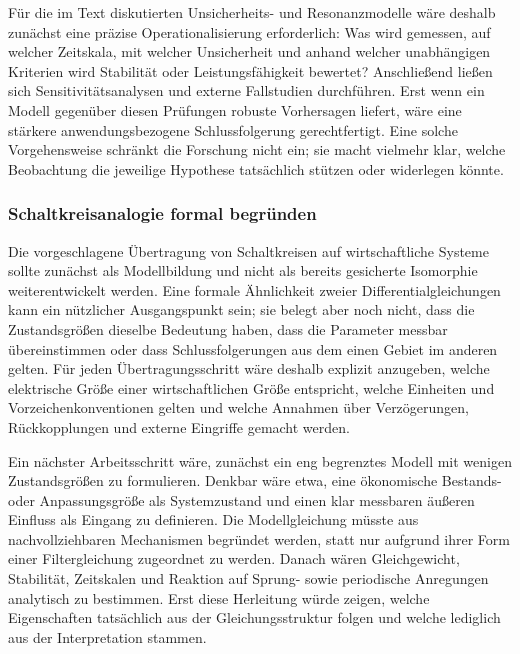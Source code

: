 \documentclass[a4paper,12pt,twoside]{report}
\theoremstyle{definition}
\begin{document}
Für die im Text diskutierten Unsicherheits- und Resonanzmodelle wäre deshalb zunächst eine präzise Operationalisierung erforderlich: Was wird gemessen, auf welcher Zeitskala, mit welcher Unsicherheit und anhand welcher unabhängigen Kriterien wird Stabilität oder Leistungsfähigkeit bewertet? Anschließend ließen sich Sensitivitätsanalysen und externe Fallstudien durchführen. Erst wenn ein Modell gegenüber diesen Prüfungen robuste Vorhersagen liefert, wäre eine stärkere anwendungsbezogene Schlussfolgerung gerechtfertigt. Eine solche Vorgehensweise schränkt die Forschung nicht ein; sie macht vielmehr klar, welche Beobachtung die jeweilige Hypothese tatsächlich stützen oder widerlegen könnte.

\subsubsection{Schaltkreisanalogie formal begründen}

Die vorgeschlagene Übertragung von Schaltkreisen auf wirtschaftliche Systeme sollte zunächst als Modellbildung und nicht als bereits gesicherte Isomorphie weiterentwickelt werden. Eine formale Ähnlichkeit zweier Differentialgleichungen kann ein nützlicher Ausgangspunkt sein; sie belegt aber noch nicht, dass die Zustandsgrößen dieselbe Bedeutung haben, dass die Parameter messbar übereinstimmen oder dass Schlussfolgerungen aus dem einen Gebiet im anderen gelten. Für jeden Übertragungsschritt wäre deshalb explizit anzugeben, welche elektrische Größe einer wirtschaftlichen Größe entspricht, welche Einheiten und Vorzeichenkonventionen gelten und welche Annahmen über Verzögerungen, Rückkopplungen und externe Eingriffe gemacht werden.

Ein nächster Arbeitsschritt wäre, zunächst ein eng begrenztes Modell mit wenigen Zustandsgrößen zu formulieren. Denkbar wäre etwa, eine ökonomische Bestands- oder Anpassungsgröße als Systemzustand und einen klar messbaren äußeren Einfluss als Eingang zu definieren. Die Modellgleichung müsste aus nachvollziehbaren Mechanismen begründet werden, statt nur aufgrund ihrer Form einer Filtergleichung zugeordnet zu werden. Danach wären Gleichgewicht, Stabilität, Zeitskalen und Reaktion auf Sprung- sowie periodische Anregungen analytisch zu bestimmen. Erst diese Herleitung würde zeigen, welche Eigenschaften tatsächlich aus der Gleichungsstruktur folgen und welche lediglich aus der Interpretation stammen.
\end{document}

